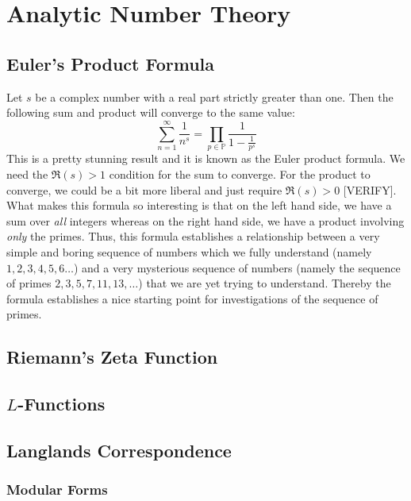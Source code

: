 \section{Analytic Number Theory}


\subsection{Euler's Product Formula}
Let $s$ be a complex number with a real part strictly greater than one. Then the following sum and product will converge to the same value:
\begin{equation}
\sum_{n=1}^{\infty} \frac{1}{n^s} = \prod_{p \in \mathbb{P}} \frac{1}{1 - \frac{1}{p^s}}
\end{equation}
This is a pretty stunning result and it is known as the Euler product formula. We need the $\Re(s) > 1$ condition for the sum to converge. For the product to converge, we could be a bit more liberal and just require $\Re(s) > 0$ [VERIFY]. What makes this formula so interesting is that on the left hand side, we have a sum over \emph{all} integers whereas on the right hand side, we have a product involving \emph{only} the primes. Thus, this formula establishes a relationship between a very simple and boring sequence of numbers which we fully understand (namely $1,2,3,4,5,6\ldots$) and a very mysterious sequence of numbers (namely the sequence of primes $2,3,5,7,11,13,\ldots$) that we are yet trying to understand. Thereby the formula establishes a nice starting point for investigations of the sequence of primes.



\subsection{Riemann's Zeta Function}

\subsection{$L$-Functions}

\subsection{Langlands Correspondence}


\subsubsection{Modular Forms}




\begin{comment}

A crazy result using Euler's Product Formula
https://www.youtube.com/watch?v=tSfNNXCBGrs

\end{comment}